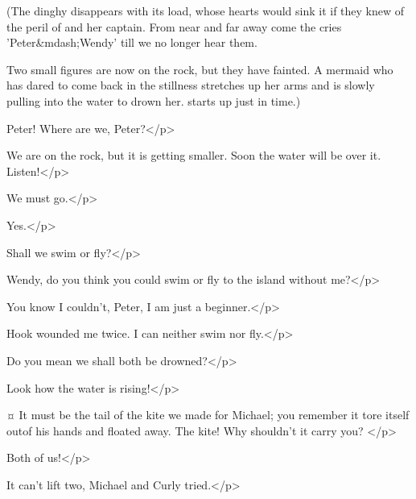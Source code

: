 \begin{stagedir}
(The dinghy disappears with its load, whose hearts would sink it if they knew of the peril of \wendy and her captain.
From near and far away come the cries 'Peter&mdash;Wendy' till we no longer hear them.

Two small figures are now on the rock, but they have fainted.
A mermaid who has dared to come back in the stillness stretches up her arms
and is slowly pulling \wendy into the water to drown her.
\wendy starts up just in time.)
\end{stagedir}

\wendyspeaks
Peter!
Where are we, Peter?</p>

\peterspeaks
We are on the rock, but it is getting smaller.
Soon the water will be over it.
Listen!</p>


\wendyspeaks
We must go.</p>

\peterspeaks
Yes.</p>

\wendyspeaks
Shall we swim or fly?</p>

\peterspeaks
Wendy, do you think you could swim or fly to the island without me?</p>

\wendyspeaks
You know I couldn't, Peter, I am just a beginner.</p>

\peterspeaks
Hook wounded me twice.
I can neither swim nor fly.</p>

\wendyspeaks
Do you mean we shall both be drowned?</p>

\peterspeaks
Look how the water is rising!</p>


\peterspeaks {}¤
It must be the tail of the kite we made for Michael; you remember it tore itself outof his hands and floated away.
The kite!
Why shouldn't it carry you?
</p>

\wendyspeaks
Both of us!</p>

\peterspeaks
It can't lift two, Michael and Curly tried.</p>


